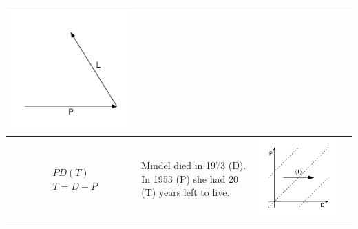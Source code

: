 \documentclass[11pt,oneside,a4paper]{article} %
\begin{document}
\begin{center}
\begin{longtable}{m{}m{}m{}m{}}
  \includegraphics[width = \linewidth]{Figures/JonasTable/LP_iso.pdf}  \\
  \midrule
  $$\begin{aligned}
    &PD(T) \\
    &T = D - P
  \end{aligned}$$ &
  Mindel died in 1973 (D). In 1953 (P) she had 20 (T) years left to live. &
  \includegraphics[width = \linewidth]{Figures/JonasTable/PDt.pdf} &

\end{longtable}
\end{center}
\end{document}
